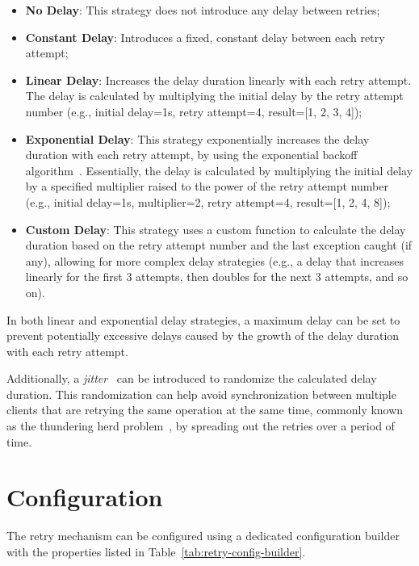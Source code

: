 \begin{itemize}
    \item \textbf{No Delay}: This strategy does not introduce any delay between retries;
    \item \textbf{Constant Delay}: Introduces a fixed, constant delay between each retry attempt;
    \item \textbf{Linear Delay}: Increases the delay duration linearly with each retry attempt.
    The delay is calculated by multiplying the initial delay by the retry attempt number (e.g., initial delay=1s, retry attempt=4, result=[1, 2, 3, 4]);
    \item \textbf{Exponential Delay}: This strategy exponentially increases the delay duration with each retry attempt, by using the exponential backoff algorithm~\cite{wiki:exponential-backoff}.
    Essentially, the delay is calculated by multiplying the initial delay by a specified multiplier raised to the power of the retry attempt number (e.g., initial delay=1s, multiplier=2, retry attempt=4, result=[1, 2, 4, 8]);
    \item \textbf{Custom Delay}: This strategy uses a custom function to calculate the delay duration based on the retry attempt number and the last exception caught (if any), allowing for more complex delay strategies (e.g., a delay that increases linearly for the first 3 attempts, then doubles for the next 3 attempts, and so on).
\end{itemize}

In both linear and exponential delay strategies, a maximum delay can be set to prevent potentially excessive delays caused by the growth of the delay duration with each retry attempt.

Additionally, a \textit{jitter}~\cite{wiki:jitter} can be introduced to randomize the calculated delay duration.
This randomization can help avoid synchronization between multiple clients that are retrying the same operation at the same time, commonly known as the thundering herd problem~\cite{wiki:thundering-herd-problem}, by spreading out the retries over a period of time.


\section{Configuration}\label{sec:retry-configuration}

The retry mechanism can be configured using a dedicated configuration builder with the properties listed in Table~\ref{tab:retry-config-builder}.

